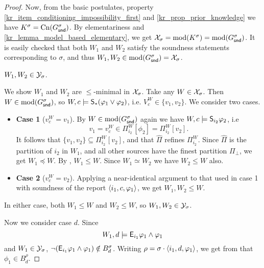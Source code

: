 \begin{proof}
    Now, from the basic postulates, property
    \cref{kr_item_conditioning_impossibility_first} and
    \cref{kr_prop_prior_knowledge} we have $K^\sigma = \cn(G^\sigma_\snd)$. By
    elementariness and \cref{kr_lemma_model_based_elementary}, we get
    $\X_\sigma = \mods(K^\sigma) = \mods(G^\sigma_\snd)$. It is easily checked
    that both $W_1$ and $W_2$ satisfy the soundness statements corresponding to
    $\sigma$, and thus $W_1, W_2 \in \mods(G^\sigma_\snd) = \X_\sigma$.

        \begin{claim}
            \label{kr_claim_w1_w2_in_ysigm}
            $W_1, W_2 \in \Y_\sigma$.
        \end{claim}
        \begin{claimproof}
            We show $W_1$ and $W_2$ are $\le$-minimal in $\X_\sigma$. Take any
            $W \in \X_\sigma$. Then $W \in \mods(G^\sigma_\snd)$, so $W, c
            \models \S_\ast(\phi_1 \lor \phi_2)$, i.e. $V^W_c \in \{v_1, v_2\}$.
            We consider two cases.
            \begin{itemize}
                \item \textbf{Case 1} ($v^W_c = v_1$). By $W \in
                    \mods(G^\sigma_\snd)$ again we have $W, c \models
                    \S_{i_2}{\phi_2}$, i.e
                    \[
                        v_1
                        = v^W_c
                        \in \Pi^W_{i_2}[\phi_2]
                        = \Pi^W_{i_2}[v_2].
                    \]
                    It follows that $\{v_1, v_2\} \subseteq \Pi^W_{i_2}[v_2]$,
                    and that $\widehat{\Pi}$ refines $\Pi^W_{i_2}$. Since
                    $\widehat{\Pi}$ is the partition of $i_2$ in $W_1$, and all
                    other sources have the finest partition $\Pi_\bot$, we get
                    $W_1 \preceq W$. By , $W_1 \le W$. Since $W_1
                    \simeq W_2$ we have $W_2 \le W$ also.

                \item \textbf{Case 2} ($v^W_c = v_2$). Applying a near-identical
                      argument to that used in case 1 with soundness of the
                      report $\tuple{i_1, c, \phi_1}$, we get $W_1, W_2 \le W$.
            \end{itemize}
            In either case, both $W_1 \le W$ and $W_2 \le W$, so $W_1, W_2 \in
            \Y_\sigma$.
        \end{claimproof}

    Now we consider case $d$. Since
    \[
        W_1, d \models \E_{i_1}{\phi_1} \land \phi_1
    \]
    and $W_1 \in \Y_\sigma$, $\neg(\E_{i_1}{\phi_1} \land \phi_1) \notin
    B^\sigma_d$. Writing $\rho = \sigma \concat \tuple{i_1, d, \phi_1}$, we get
    from \strongcondsucc{} that $\phi_1 \in B^\rho_d$.


\end{proof}
